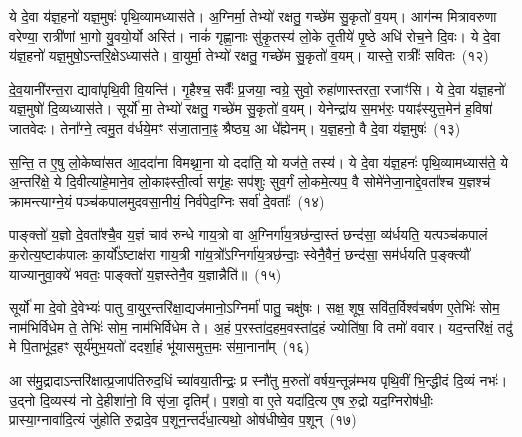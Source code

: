 {}%

ये दे॒वा य॑ज्ञ॒हनो॑ यज्ञ॒मुषः॑ पृथि॒व्यामध्यास॑ते। अ॒ग्निर्मा॒ तेभ्यो॑ रक्षतु॒ गच्छे॑म सु॒कृतो॑ व॒यम्। आग॑न्म मित्रावरुणा वरेण्या॒ रात्री॑णां भा॒गो यु॒वयो॒र्यो अस्ति॑। नाकं॑ गृह्णा॒नाः सु॑कृ॒तस्य॑ लो॒के तृ॒तीये॑ पृ॒ष्ठे अधि॑ रोच॒ने दि॒वः। ये दे॒वा य॑ज्ञ॒हनो॑ यज्ञ॒मुषो॒\-ऽन्तरि॒क्षे\-ऽध्यास॑ते। वा॒युर्मा॒ तेभ्यो॑ रक्षतु॒ गच्छे॑म सु॒कृतो॑ व॒यम्। यास्ते॒ रात्रीः᳚ सवितः~(१२)

दे॒व॒यानी॑रन्त॒रा द्यावा॑पृथि॒वी वि॒यन्ति॑। गृ॒हैश्च॒ सर्वैः᳚ प्र॒जया॒ न्वग्रे॒ सुवो॒ रुहा॑णास्तरता॒ रजाꣳ॑सि। ये दे॒वा य॑ज्ञ॒हनो॑ यज्ञ॒मुषो॑ दि॒व्यध्यास॑ते। सूर्यो॑ मा॒ तेभ्यो॑ रक्षतु॒ गच्छे॑म सु॒कृतो॑ व॒यम्। येनेन्द्रा॑य स॒मभ॑रः॒ पयाꣴ॑स्युत्त॒\-मेन॑ ह॒विषा॑ जातवेदः। तेना᳚ग्ने॒ त्वमु॒त व॑र्धये॒मꣳ स॑जा॒ताना॒ꣴ॒ श्रैष्ठ्य॒ आ धे᳚ह्येनम्। य॒ज्ञ॒हनो॒ वै दे॒वा य॑ज्ञ॒मुषः॑~(१३)

स॒न्ति॒ त ए॒षु लो॒केष्वा॑सत आ॒ददा॑ना विमथ्ना॒ना यो ददा॑ति॒ यो यज॑ते॒ तस्य॑। ये दे॒वा य॑ज्ञ॒हनः॑ पृथि॒व्यामध्यास॑ते॒ ये अ॒न्तरि॑क्षे॒ ये दि॒वीत्या॑हे॒माने॒व लो॒काꣴस्ती॒र्त्वा सगृ॑हः॒ सप॑शुः सुव॒र्गं लो॒कमे॒त्यप॒ वै सोमे॑नेजा॒नाद्दे॒वता᳚श्च य॒ज्ञश्च॑ क्रामन्त्याग्ने॒यं पञ्च॑कपालमुदवसा॒नीयं॒ निर्व॑पेद॒ग्निः सर्वा॑ दे॒वताः᳚~(१४)

पाङ्क्तो॑ य॒ज्ञो दे॒वता᳚श्चै॒व य॒ज्ञं चाव॑ रुन्धे गाय॒त्रो वा अ॒ग्निर्गा॑य॒त्रछ॑न्दा॒स्तं छन्द॑सा॒ व्य॑र्धयति॒ यत्पञ्च॑कपालं क॒रोत्य॒ष्टाक॑पालः का॒र्यो᳚\-ऽष्टाक्ष॑रा गाय॒त्री गा॑य॒त्रो᳚\-ऽग्निर्गा॑य॒त्रछ॑न्दाः॒ स्वेनै॒वैनं॒ छन्द॑सा॒ सम॑र्धयति प॒ङ्क्त्यौ॑ याज्यानुवा॒क्ये॑ भवतः॒ पाङ्क्तो॑ य॒ज्ञस्तेनै॒व य॒ज्ञान्नैति॑॥~(१५)

{\anuvakamend[{स॒वि॒त॒र्दे॒वा य॑ज्ञ॒मुषः॒ सर्वा॑ दे॒वता॒स्त्रिच॑त्वारिꣳशच्च}]}%

सूर्यो॑ मा दे॒वो दे॒वेभ्यः॑ पातु वा॒युर॒न्तरि॑क्षा॒द्यज॑मानो॒\-ऽग्निर्मा॑ पातु॒ चक्षु॑षः। सक्ष॒ शूष॒ सवि॑त॒र्विश्व॑चर्\mbox{}षण ए॒तेभिः॑ सोम॒ नाम॑भिर्विधेम ते॒ तेभिः॑ सोम॒ नाम॑भिर्विधेम ते। अ॒हं प॒रस्ता॑द॒हम॒वस्ता॑द॒हं ज्योति॑षा॒ वि तमो॑ ववार। यद॒न्तरि॑क्षं॒ तदु॑ मे पि॒ताभू॑द॒हꣳ सूर्य॑मुभ॒यतो॑ ददर्\mbox{}शा॒हं भू॑यासमुत्त॒मः स॑मा॒नाना᳚म्~(१६)

आ स॑मु॒द्रादा\-ऽन्तरि॑क्षात्प्र॒जा\-प॑तिरुद॒धिं च्या॑वया॒तीन्द्रः॒ प्र स्नौ॑तु म॒रुतो॑ वर्\mbox{}षय॒न्तून्न॑म्भय पृथि॒वीं भि॒न्द्धीदं दि॒व्यं नभः॑। उ॒द्नो दि॒व्यस्य॑ नो दे॒हीशा॑नो॒ वि सृ॑जा॒ दृतिम्᳚। प॒शवो॒ वा ए॒ते यदा॑दि॒त्य ए॒ष रु॒द्रो यद॒ग्निरोष॑धीः॒ प्रास्या॒ग्नावा॑दि॒त्यं जु॑होति रु॒द्रादे॒व प॒शून॒न्तर्द॑धा॒त्यथो॒ ओष॑धीष्वे॒व प॒शून्~(१७)

